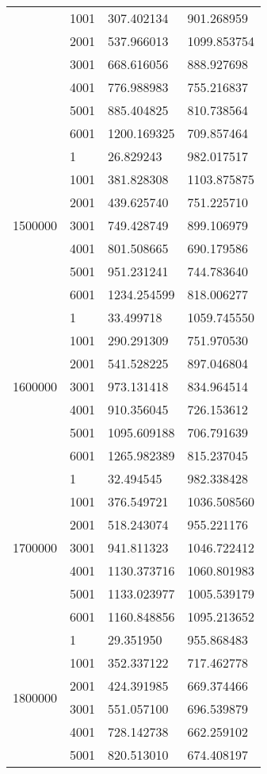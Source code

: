 \begin{table}[htb!]
\begin{tabular}{llll}
 & 1001 & 307.402134 & 901.268959 \\
 & 2001 & 537.966013 & 1099.853754 \\
 & 3001 & 668.616056 & 888.927698 \\
 & 4001 & 776.988983 & 755.216837 \\
 & 5001 & 885.404825 & 810.738564 \\
 & 6001 & 1200.169325 & 709.857464 \\
\multirow[c]{7}{*}{1500000} & 1 & 26.829243 & 982.017517 \\
 & 1001 & 381.828308 & 1103.875875 \\
 & 2001 & 439.625740 & 751.225710 \\
 & 3001 & 749.428749 & 899.106979 \\
 & 4001 & 801.508665 & 690.179586 \\
 & 5001 & 951.231241 & 744.783640 \\
 & 6001 & 1234.254599 & 818.006277 \\
\multirow[c]{7}{*}{1600000} & 1 & 33.499718 & 1059.745550 \\
 & 1001 & 290.291309 & 751.970530 \\
 & 2001 & 541.528225 & 897.046804 \\
 & 3001 & 973.131418 & 834.964514 \\
 & 4001 & 910.356045 & 726.153612 \\
 & 5001 & 1095.609188 & 706.791639 \\
 & 6001 & 1265.982389 & 815.237045 \\
\multirow[c]{7}{*}{1700000} & 1 & 32.494545 & 982.338428 \\
 & 1001 & 376.549721 & 1036.508560 \\
 & 2001 & 518.243074 & 955.221176 \\
 & 3001 & 941.811323 & 1046.722412 \\
 & 4001 & 1130.373716 & 1060.801983 \\
 & 5001 & 1133.023977 & 1005.539179 \\
 & 6001 & 1160.848856 & 1095.213652 \\
\multirow[c]{7}{*}{1800000} & 1 & 29.351950 & 955.868483 \\
 & 1001 & 352.337122 & 717.462778 \\
 & 2001 & 424.391985 & 669.374466 \\
 & 3001 & 551.057100 & 696.539879 \\
 & 4001 & 728.142738 & 662.259102 \\
 & 5001 & 820.513010 & 674.408197 \\

\end{tabular}
\end{table}
